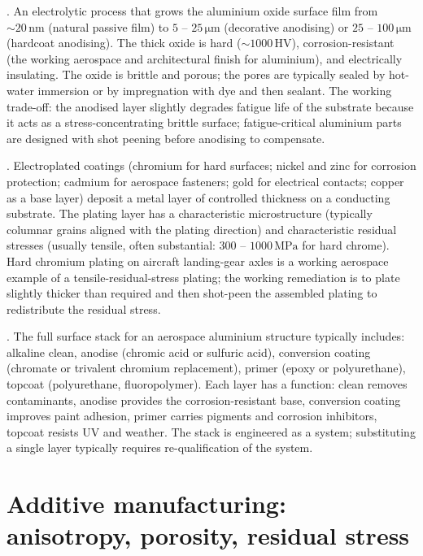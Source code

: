 . An electrolytic process that grows
the aluminium oxide surface film from $\sim 20\,\text{nm}$ (natural
passive film) to $5$ -- $25\,\si{\micro\meter}$ (decorative anodising)
or $25$ -- $100\,\si{\micro\meter}$ (hardcoat anodising). The
thick oxide is hard ($\sim 1000\,\text{HV}$), corrosion-resistant
(the working aerospace and architectural finish for aluminium), and
electrically insulating. The oxide is brittle and porous; the pores
are typically sealed by hot-water immersion or by impregnation with
dye and then sealant. The working trade-off: the anodised layer
slightly degrades fatigue life of the substrate because it acts as
a stress-concentrating brittle surface; fatigue-critical aluminium
parts are designed with shot peening before anodising to compensate.

. Electroplated coatings (chromium for hard surfaces;
nickel and zinc for corrosion protection; cadmium for aerospace
fasteners; gold for electrical contacts; copper as a base layer)
deposit a metal layer of controlled thickness on a conducting
substrate. The plating layer has a characteristic microstructure
(typically columnar grains aligned with the plating direction) and
characteristic residual stresses (usually tensile, often substantial:
$300$ -- $1000\,\text{MPa}$ for hard chrome). Hard chromium plating on
aircraft landing-gear axles is a working aerospace example of a
tensile-residual-stress plating; the working remediation is to plate
slightly thicker than required and then shot-peen the assembled
plating to redistribute the residual stress.

. The full surface stack for an aerospace aluminium
structure typically includes: alkaline clean, anodise (chromic acid
or sulfuric acid), conversion coating (chromate or trivalent chromium
replacement), primer (epoxy or polyurethane), topcoat (polyurethane,
fluoropolymer). Each layer has a function: clean removes contaminants,
anodise provides the corrosion-resistant base, conversion coating
improves paint adhesion, primer carries pigments and corrosion
inhibitors, topcoat resists UV and weather. The stack is engineered
as a system; substituting a single layer typically requires
re-qualification of the system.

\section{Additive manufacturing: anisotropy, porosity, residual stress}

